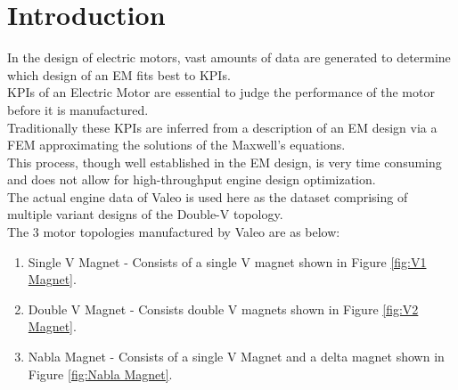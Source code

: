 \documentclass{report} %
\begin{document}
\newpage

\newpage

\chapter{Introduction} 
In the design of electric motors, vast amounts of data are generated to determine which design of an \ac{EM} fits best to \ac{KPI}s. \\
\ac{KPI}s of an Electric Motor are essential to judge the performance of the motor before it is manufactured. \\
Traditionally these \ac{KPI}s are inferred from a description of an \ac{EM} design via a \ac{FEM} approximating the solutions of the Maxwell’s equations. \\
This process, though well established in the \ac{EM} design, is very time consuming and does not allow for high-throughput engine design optimization. \\
The actual engine data of Valeo is used here as the dataset comprising of multiple variant designs of the Double-V topology.\\

The 3 motor topologies manufactured by Valeo are as below:
\begin{enumerate}
    \item Single V Magnet - Consists of a single V magnet shown in Figure \ref{fig:V1 Magnet}.
    \item Double V Magnet - Consists double V magnets shown in Figure \ref{fig:V2 Magnet}.
    \item Nabla Magnet - Consists of a single V Magnet and a delta magnet shown in Figure \ref{fig:Nabla Magnet}.
\end{enumerate}
\end{document}
